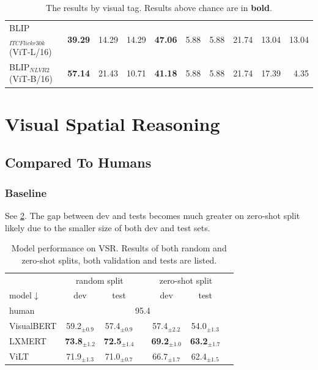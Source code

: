\begin{table}[ht]
\begin{adjustbox}{max width=\textwidth}
\begin{tabular}{l|rrr|rrr|rrr}
 BLIP$_{ITC Flickr30k}$ (ViT-L/16)   & \textbf{39.29} & 14.29          & 14.29          & \textbf{47.06} & 5.88           & 5.88           & 21.74          & 13.04          & 13.04          \\
 BLIP$_{NLVR2}$ (ViT-B/16)           & \textbf{57.14} & 21.43          & 10.71          & \textbf{41.18} & 5.88           & 5.88           & 21.74          & 17.39          & 4.35           \\
\bottomrule
\end{tabular}
  \end{adjustbox}
  \caption{The results by visual tag. Results above chance are in \textbf{bold}.}
    \label{tab:results-by-visual-tag-ours}
\end{table}

\section{Visual Spatial Reasoning}

\subsection{Compared To Humans}

\subsubsection{Baseline}

See \cref{tab:vsr_results_base}. The gap between dev and tests becomes much greater on zero-shot split likely due to the smaller size of both dev and test sets.

\begin{table}[ht]
\centering
\small
\begin{tabular}{lcccccc}
\toprule
& \multicolumn{2}{c}{random split} &  & \multicolumn{2}{c}{zero-shot split} \\
\cmidrule(l){2-3} 	\cmidrule(l){4-6}
model$\downarrow$ & dev & test & & dev & test  \\
\midrule
human & \multicolumn{5}{c}{95.4}   \\
\midrule
VisualBERT & 59.2$_{\pm0.9}$ & 57.4$_{\pm0.9}$ & & 57.4$_{\pm2.2}$  & 54.0$_{\pm1.3}$  \\ 
LXMERT & \textbf{73.8}$_{\pm1.2}$  & \textbf{72.5}$_{\pm1.4}$ & & \textbf{69.2}$_{\pm1.0}$  & \textbf{63.2}$_{\pm1.7}$  \\ 
ViLT & 71.9$_{\pm1.3}$  & 71.0$_{\pm0.7}$  & & 66.7$_{\pm1.7}$  & 62.4$_{\pm1.5}$ \\ 
\bottomrule
\end{tabular}
\caption{Model performance on VSR. Results of both random and zero-shot splits, both validation and tests are listed.}
\label{tab:vsr_results_base}
\end{table}

